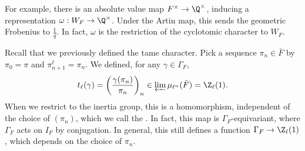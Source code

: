 \documentclass[a4paper]{article}
\begin{document}
For example, there is an absolute value map $F^\times \to \Q^\times$, inducing a representation $\omega: W_F \to \Q^\times$. Under the Artin map, this sends the geometric Frobenius to $\frac{1}{q}$. In fact, $\omega$ is the restriction of the cyclotomic character to $W_F$.
%

Recall that we previously defined the tame character. Pick a sequence $\pi_n \in \bar{F}$ by $\pi_0 = \pi$ and $\pi_{n + 1}^\ell = \pi_n$. We defined, for any $\gamma \in \Gamma_F$,
\[
  t_\ell(\gamma) = \left(\frac{\gamma(\pi_n)}{\pi_n}\right)_n \in \varprojlim \mu_{\ell^n} (\bar{F}) = \Z_\ell(1).
\]
When we restrict to the inertia group, this is a homomorphism, independent of the choice of $(\pi_n)$, which we call the . In fact, this map is $\Gamma_F$-equivariant, where $\Gamma_F$ acts on $I_F$ by conjugation. In general, this still defines a function $\Gamma_F \to \Z_\ell(1)$, which depends on the choice of $\pi_n$.
\end{document}
